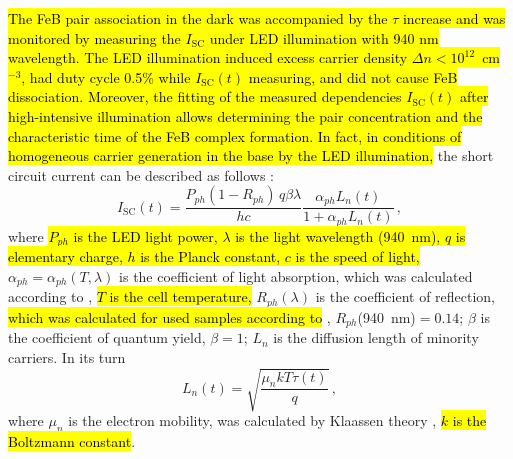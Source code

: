 \documentclass[sn-mathphys]{sn-jnl}%
\theoremstyle{thmstyleone}%
\theoremstyle{thmstyletwo}%
\theoremstyle{thmstylethree}%
\begin{document}
\hl{The FeB pair association in the dark was accompanied by the $\tau$ increase and
was monitored by measuring the $I_\mathrm{SC}$ under LED illumination with 940 nm wavelength.
The LED illumination induced excess carrier density $\Delta n<10^{12}$~cm$^{-3}$,
had duty cycle 0.5\% while $I_\mathrm{SC}(t)$ measuring,
and did not cause FeB dissociation.
Moreover, the fitting of the measured dependencies $I_\mathrm{SC}(t)$ after high-intensive illumination
allows determining  the pair concentration and the characteristic time of the FeB complex formation.
In fact, in conditions of homogeneous carrier generation in the base  by the LED illumination,}
the short circuit current can be described as follows \cite{Bube,Razeghi}:
\begin{equation}
\label{eqIsc}
I_\mathrm{SC}(t)=\frac{P_{ph}(1-R_{ph})\,q\beta\lambda}{hc}\frac{\alpha_{ph}L_n(t)}{1+\alpha_{ph}L_n(t)}\,,
\end{equation}
where
\hl{$P_{ph}$ is the LED light power,
$\lambda$ is the light wavelength (940~nm),
$q$ is elementary charge,
$h$ is the Planck constant,
$c$ is the speed of light,}
$\alpha_{ph}=\alpha_{ph}(T,\lambda)$ is the coefficient of light absorption,
which was calculated according to \cite{Si:Absorb,GreenOptic},
\hl{$T$ is the cell temperature,}
$R_{ph}(\lambda)$ is the coefficient of reflection,
\hl{which was calculated for used samples according to} \cite{KostRefl2000,KostRefl2000A}, $R_{ph}$(940~nm)$=0.14$;
$\beta$ is the coefficient of quantum  yield, $\beta=1$;
$L_n$  is the diffusion length of minority carriers.
In its turn
\begin{equation}
\label{eqLn}
L_n(t)=\sqrt{\frac{\mu_nkT\tau(t)}{q}}\,,
\end{equation}
where
$\mu_n$ is the electron mobility, was calculated by Klaassen theory \cite{KLAASSEN953},
\hl{$k$ is the Boltzmann constant}.
\end{document}

